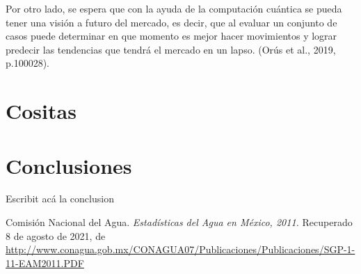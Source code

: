 \documentclass{article}
\begin{document}
Por otro lado, se espera que con la ayuda de la computación cuántica se pueda tener una visión a futuro del mercado, es decir, que al evaluar un conjunto de casos puede determinar en que momento es mejor hacer movimientos y lograr predecir las tendencias que tendrá el mercado en un lapso. (Orús et al., 2019, p.100028).






\section{Cositas}




\section{Conclusiones}
\vspace{1cm}
Escribit acá la conclusion



\clearpage
\begin{thebibliography}{99}

Comisión Nacional del Agua.
\textit{Estadísticas del Agua en México, 2011.} Recuperado 8 de agosto de 2021, de \url{http://www.conagua.gob.mx/CONAGUA07/Publicaciones/Publicaciones/SGP-1-11-EAM2011.PDF}

\end{thebibliography}
\end{document}
